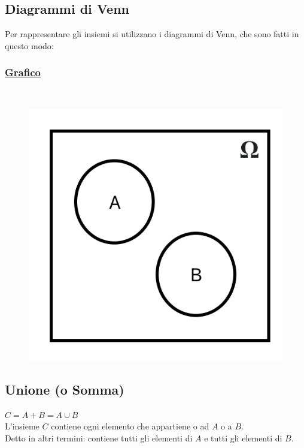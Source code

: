 \documentclass{article}
\begin{document}
\subsection{Diagrammi di Venn}
Per rappresentare gli insiemi si utilizzano i diagrammi di Venn, che sono fatti in questo modo:
\subsubsection{\underline{Grafico}} ~\\
\begin{figure}[ht]
\centering
\includegraphics[scale=0.40]{images/15.Venn.png}
\end{figure} 

\subsection{Unione (o Somma)}
$C = A +B = A \cup B$ \\
L’insieme $C$ contiene ogni elemento che appartiene o ad $A$ o a $B$. \\
Detto in altri termini: contiene tutti gli elementi di $A$ e tutti gli elementi di $B$.
\end{document}
